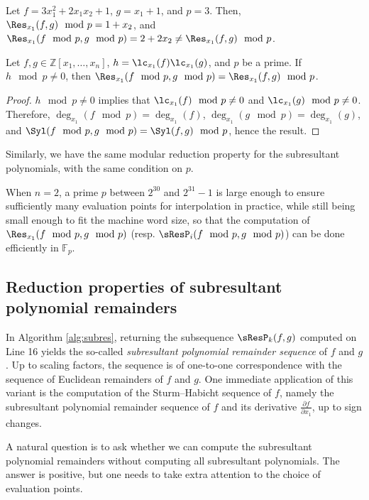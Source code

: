 \begin{example}
    Let $f=3x_1^2+2x_1x_2+1$, $g=x_1+1$, and $p=3$. Then, $\Res_{x_1}(f,g)\mod p=1+x_2$, and $\Res_{x_1}(f\mod p,g\mod p)=2+2x_2\neq\Res_{x_1}(f,g)\mod p$.
\end{example}

\begin{proposition}
    Let $f,g\in\mathbb{Z}[x_1,\dots,x_n]$, $h=\lc_{x_1}(f)\lc_{x_1}(g)$, and $p$ be a prime. If $h\mod p\neq 0$, then $\Res_{x_1}(f\mod p,g\mod p)=\Res_{x_1}(f,g)\mod p$.
\end{proposition}

\begin{proof}
    $h\mod p\neq 0$ implies that $\lc_{x_1}(f)\mod p\neq 0$ and $\lc_{x_1}(g)\mod p\neq 0$. Therefore, $\deg_{x_1}(f\mod p)=\deg_{x_1}(f)$, $\deg_{x_1}(g\mod p)=\deg_{x_1}(g)$, and $\Syl(f\mod p,g\mod p)=\Syl(f,g)\mod p$, hence the result.
\end{proof}

Similarly, we have the same modular reduction property for the subresultant polynomials, with the same condition on $p$.

When $n=2$, a prime $p$ between $2^{30}$ and $2^{31}-1$ is large enough to ensure sufficiently many evaluation points for interpolation in practice, while still being small enough to fit the machine word size, so that the computation of $\Res_{x_1}(f\mod p, g\mod p)$ (resp. $\sResP_i(f\mod p, g\mod p)$) can be done efficiently in $\mathbb{F}_p$.


\subsection{Reduction properties of subresultant polynomial remainders}

In Algorithm \ref{alg:subres}, returning the subsequence $\sResP_k(f,g)$ computed on Line 16 yields the so-called \emph{subresultant polynomial remainder sequence} of $f$ and $g$. Up to scaling factors, the sequence is of one-to-one correspondence with the sequence of Euclidean remainders of $f$ and $g$. One immediate application of this variant is the computation of the Sturm–Habicht sequence of $f$, namely the subresultant polynomial remainder sequence of $f$ and its derivative $\frac{\partial f}{\partial x_1}$, up to sign changes.

A natural question is to ask whether we can compute the subresultant polynomial remainders without computing all subresultant polynomials. The answer is positive, but one needs to take extra attention to the choice of evaluation points.

